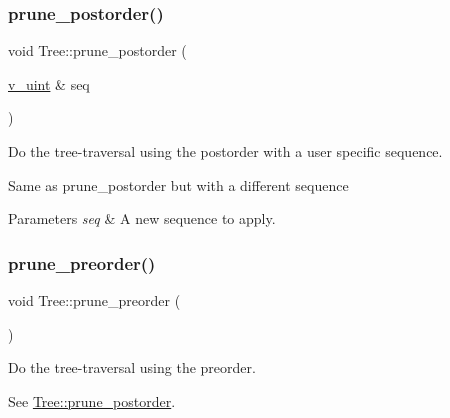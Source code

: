 \subsubsection{\texorpdfstring{prune\+\_\+postorder()}{prune\_postorder()}\hspace{0.1cm}{\footnotesize\ttfamily [2/2]}}
{\footnotesize\ttfamily void Tree\+::prune\+\_\+postorder (\begin{DoxyParamCaption}\item[{\hyperlink{namespacepruner_af0145646bd7ede012cd336b416bc5579}{v\+\_\+uint} \&}]{seq }\end{DoxyParamCaption})\hspace{0.3cm}{\ttfamily [inline]}}



Do the tree-\/traversal using the postorder with a user specific sequence. 

Same as {\ttfamily prune\+\_\+postorder} but with a different sequence 
\begin{DoxyParams}{Parameters}
{\em seq} & A new sequence to apply. \\
\hline
\end{DoxyParams}
\mbox{\label{classpruner_1_1Tree_ac85bfb083b3856e65987e1d15885a61c}} 
\subsubsection{\texorpdfstring{prune\+\_\+preorder()}{prune\_preorder()}\hspace{0.1cm}{\footnotesize\ttfamily [1/2]}}
{\footnotesize\ttfamily void Tree\+::prune\+\_\+preorder (\begin{DoxyParamCaption}{ }\end{DoxyParamCaption})\hspace{0.3cm}{\ttfamily [inline]}}



Do the tree-\/traversal using the preorder. 

See \hyperlink{classpruner_1_1Tree_a7d465880d18acf79f3a772ea5412b0d7}{Tree\+::prune\+\_\+postorder}. \mbox{\label{classpruner_1_1Tree_a6841109c7ff37bcabdf3a4d79009ad21}} 
